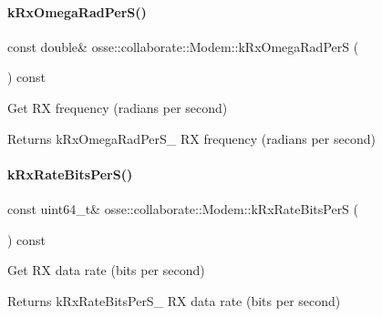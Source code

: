 \paragraph{\texorpdfstring{k\+Rx\+Omega\+Rad\+Per\+S()}{kRxOmegaRadPerS()}}
{\footnotesize\ttfamily const double\& osse\+::collaborate\+::\+Modem\+::k\+Rx\+Omega\+Rad\+PerS (\begin{DoxyParamCaption}{ }\end{DoxyParamCaption}) const\hspace{0.3cm}{\ttfamily [inline]}}



Get RX frequency (radians per second) 

\begin{DoxyReturn}{Returns}
k\+Rx\+Omega\+Rad\+Per\+S\+\_\+ RX frequency (radians per second) 
\end{DoxyReturn}
\mbox{\label{classosse_1_1collaborate_1_1_modem_a899a9e97b55878e6b521038ddb2a9548}} 
\paragraph{\texorpdfstring{k\+Rx\+Rate\+Bits\+Per\+S()}{kRxRateBitsPerS()}}
{\footnotesize\ttfamily const uint64\+\_\+t\& osse\+::collaborate\+::\+Modem\+::k\+Rx\+Rate\+Bits\+PerS (\begin{DoxyParamCaption}{ }\end{DoxyParamCaption}) const\hspace{0.3cm}{\ttfamily [inline]}}



Get RX data rate (bits per second) 

\begin{DoxyReturn}{Returns}
k\+Rx\+Rate\+Bits\+Per\+S\+\_\+ RX data rate (bits per second) 
\end{DoxyReturn}
\mbox{\label{classosse_1_1collaborate_1_1_modem_ad37beed0399591a98a47b62966a7c2c0}} 
